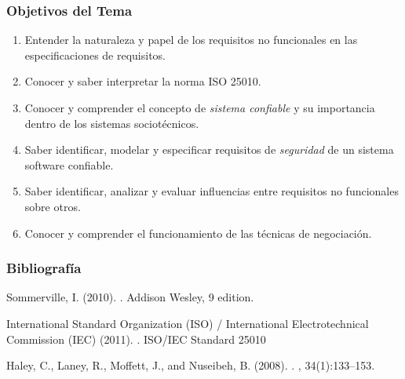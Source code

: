\documentclass[handout,a4paper,slidestop,xcolor=pst,dvips,blue]{beamer}
\begin{document}
\begin{frame}[c]
    \frametitle{Objetivos del Tema}
    \begin{enumerate}[<+->]
         \item Entender la naturaleza y papel de los requisitos no funcionales en las especificaciones de requisitos.
         \item Conocer y saber interpretar la norma ISO 25010.
         \item Conocer y comprender el concepto de \emph{sistema confiable} y su importancia dentro de los sistemas sociotécnicos.
         \item Saber identificar, modelar y especificar requisitos de \emph{seguridad} de un sistema software confiable.
         \item Saber identificar, analizar y evaluar influencias entre requisitos no funcionales sobre otros.
         \item Conocer y comprender el funcionamiento de las técnicas de negociación.
    \end{enumerate}
\end{frame}

\begin{frame}[c]
    \frametitle{Bibliografía}
    \begin{thebibliography}{}
        Sommerville, I. (2010).
        .
        \newblock Addison Wesley, 9 edition.

        International Standard Organization (ISO) / International Electrotechnical Commission (IEC) (2011).
        . ISO/IEC Standard 25010

        Haley, C., Laney, R., Moffett, J., and Nuseibeh, B. (2008).
        .
        , 34(1):133--153.
    \end{thebibliography}
\end{frame}
\end{document}
